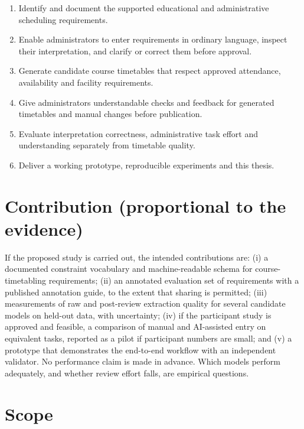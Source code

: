 \documentclass[
  11pt,a4paper,oneside]{report}
\providecommand{\tightlist}{%
  \setlength{\itemsep}{0pt}\setlength{\parskip}{0pt}}
\begin{document}
\begin{enumerate}
\def\labelenumi{\arabic{enumi}.}
\tightlist
\item
  Identify and document the supported educational and administrative scheduling requirements.
\item
  Enable administrators to enter requirements in ordinary language, inspect their interpretation, and clarify or correct them before approval.
\item
  Generate candidate course timetables that respect approved attendance, availability and facility requirements.
\item
  Give administrators understandable checks and feedback for generated timetables and manual changes before publication.
\item
  Evaluate interpretation correctness, administrative task effort and understanding separately from timetable quality.
\item
  Deliver a working prototype, reproducible experiments and this thesis.
\end{enumerate}

\hypertarget{contribution-proportional-to-the-evidence}{%
\section{Contribution (proportional to the
evidence)}\label{contribution-proportional-to-the-evidence}}

If the proposed study is carried out, the intended contributions are:
(i) a documented constraint vocabulary and machine-readable schema for
course-timetabling requirements; (ii) an annotated evaluation set of
requirements with a published annotation guide, to the extent that
sharing is permitted; (iii) measurements of raw and post-review
extraction quality for several candidate models on held-out data, with
uncertainty; (iv) if the participant study is approved and feasible, a comparison of manual and AI-assisted entry on
equivalent tasks, reported as a pilot if participant numbers are small;
and (v) a prototype that demonstrates the end-to-end workflow with an
independent validator. No performance claim is made in advance. Which
models perform adequately, and whether review effort falls, are
empirical questions.

\hypertarget{scope}{%
\section{Scope}\label{scope}}
\end{document}
